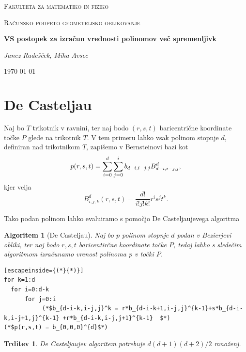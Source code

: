\documentclass{article}
\newtheorem{algoritm}{Algoritem}[section]
\newtheorem{trditev}{Trditev}[section]
\begin{document}
\begin{titlepage}
	\centering
	{\scshape\LARGE Fakulteta za matematiko in fiziko \par}
	\vspace{1cm}
	{\scshape\Large Računsko podprto geometrijsko oblikovanje\par}
	\vspace{1.5cm}
	{\huge\bfseries VS postopek za izračun vrednosti polinomov več spremenljivk\par}
	\vspace{2cm}
	{\Large\itshape Janez Radešček, Miha Avsec\par}
	\vfill

	\vfill

	{\large \today\par}
\end{titlepage}


\section{De Casteljau}

Naj bo $T$ trikotnik v ravnini, ter naj bodo $(r,s,t)$ baricentrične koordinate točke $P$ glede na trikotnik $T$. V tem primeru lahko vsak polinom stopnje $d$, definiran nad trikotnikom $T$, zapišemo v Bernsteinovi bazi kot
$$p(r,\\s,\\t) = \sum_{i=0}^{d}\sum_{j=0}^{i}b_{d-i,i-j,j}B_{d-i,i-j,j}^{d},$$
kjer velja
$$B_{i,j,k}^{d}(r,s,t) = \frac{d!}{i!j!k!}r^{i}s^jt^k.$$

Tako podan polinom lahko evaluiramo s pomočjo De Casteljaujevega algoritma
\begin{algoritm}[De Casteljau]
Naj bo $p$ polinom stopnje $d$ podan v Bezierjevi obliki, ter naj bodo $ r,s,t$ baricentirčne koordinate točke $P$, tedaj lahko s sledečim algoritmom izračunamo vrenost polinoma p v točki $P$.
\begin{lstlisting}[escapeinside={(*}{*)}]
for k=1:d
  for i=0:d-k
      for j=0:i
           (*$b_{d-i-k,i-j,j}^k = r*b_{d-i-k+1,i-j,j}^{k-1}+s*b_{d-i-k,i-j+1,j}^{k-1} +r*b_{d-i-k,i-j,j+1}^{k-1}  $*)
(*$p(r,s,t) = b_{0,0,0}^{d}$*)
\end{lstlisting}
\end{algoritm}

\begin{trditev}
\label{decast}
De Casteljaujev algoritem potrebuje $d(d+1)(d+2)/2$ množenj.
\end{trditev}
\end{document}
